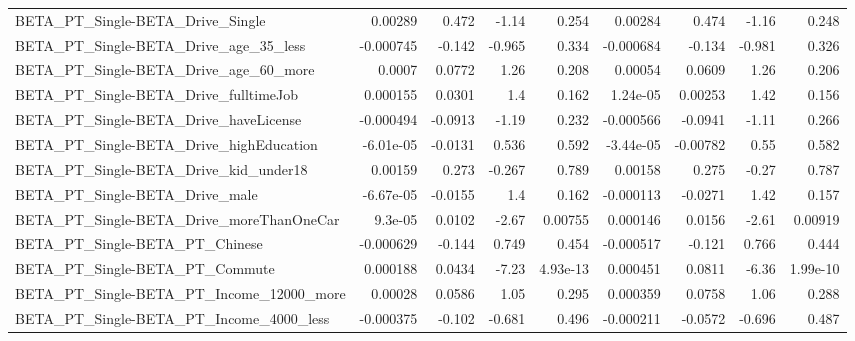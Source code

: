 \begin{tabular}{lrrrrrrrr}
BETA\_PT\_Single-BETA\_Drive\_Single                   &     0.00289 &        0.472 &     -1.14 &    0.254 &    0.00284 &       0.474 &        -1.16 &         0.248 \\
BETA\_PT\_Single-BETA\_Drive\_age\_35\_less              &   -0.000745 &       -0.142 &    -0.965 &    0.334 &  -0.000684 &      -0.134 &       -0.981 &         0.326 \\
BETA\_PT\_Single-BETA\_Drive\_age\_60\_more              &      0.0007 &       0.0772 &      1.26 &    0.208 &    0.00054 &      0.0609 &         1.26 &         0.206 \\
BETA\_PT\_Single-BETA\_Drive\_fulltimeJob              &    0.000155 &       0.0301 &       1.4 &    0.162 &   1.24e-05 &     0.00253 &         1.42 &         0.156 \\
BETA\_PT\_Single-BETA\_Drive\_haveLicense              &   -0.000494 &      -0.0913 &     -1.19 &    0.232 &  -0.000566 &     -0.0941 &        -1.11 &         0.266 \\
BETA\_PT\_Single-BETA\_Drive\_highEducation            &   -6.01e-05 &      -0.0131 &     0.536 &    0.592 &  -3.44e-05 &    -0.00782 &         0.55 &         0.582 \\
BETA\_PT\_Single-BETA\_Drive\_kid\_under18              &     0.00159 &        0.273 &    -0.267 &    0.789 &    0.00158 &       0.275 &        -0.27 &         0.787 \\
BETA\_PT\_Single-BETA\_Drive\_male                     &   -6.67e-05 &      -0.0155 &       1.4 &    0.162 &  -0.000113 &     -0.0271 &         1.42 &         0.157 \\
BETA\_PT\_Single-BETA\_Drive\_moreThanOneCar           &     9.3e-05 &       0.0102 &     -2.67 &  0.00755 &   0.000146 &      0.0156 &        -2.61 &       0.00919 \\
BETA\_PT\_Single-BETA\_PT\_Chinese                     &   -0.000629 &       -0.144 &     0.749 &    0.454 &  -0.000517 &      -0.121 &        0.766 &         0.444 \\
BETA\_PT\_Single-BETA\_PT\_Commute                     &    0.000188 &       0.0434 &     -7.23 & 4.93e-13 &   0.000451 &      0.0811 &        -6.36 &      1.99e-10 \\
BETA\_PT\_Single-BETA\_PT\_Income\_12000\_more           &     0.00028 &       0.0586 &      1.05 &    0.295 &   0.000359 &      0.0758 &         1.06 &         0.288 \\
BETA\_PT\_Single-BETA\_PT\_Income\_4000\_less            &   -0.000375 &       -0.102 &    -0.681 &    0.496 &  -0.000211 &     -0.0572 &       -0.696 &         0.487 \\

\end{tabular}
